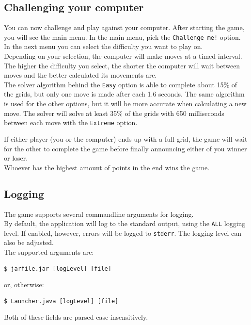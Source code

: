 \documentclass[a4paper,11pt,report]{scrartcl}
\begin{document}
\subsection{Challenging your computer}

You can now challenge and play against your computer. After starting the game, you will see the main menu. In the main menu, pick the \texttt{Challenge me!} option. In the next menu you can select the difficulty you want to play on.\\

Depending on your selection, the computer will make moves at a timed interval. The higher the difficulty you select, the shorter the computer will wait between moves and the better calculated its movements are.\\

The solver algorithm behind the \texttt{Easy} option is able to complete about
15\% of the grids, but only one move is made after each 1.6 seconds. The same algorithm is used for the other options, but it will be more accurate when calculating a new move. The solver will solve at least 35\% of the grids with 650 milliseconds between each move with the \texttt{Extreme} option.

If either player (you or the computer) ends up with a full grid, the game will wait for the other to complete the game before finally announcing either of you winner or loser.\\

Whoever has the highest amount of points in the end wins the game.

\subsection{Logging}
The game supports several commandline arguments for logging.\\

By default, the application will log to the standard output, using the
\texttt{ALL} logging level. If enabled, however, errors will be logged to
\texttt{stderr}. The logging level can also be adjusted.\\

The supported arguments are:
\begin{verbatim}
$ jarfile.jar [logLevel] [file]
\end{verbatim}
or, otherwise:
\begin{verbatim}
$ Launcher.java [logLevel] [file]
\end{verbatim}
Both of these fields are parsed case-insensitively.\\
\end{document}
